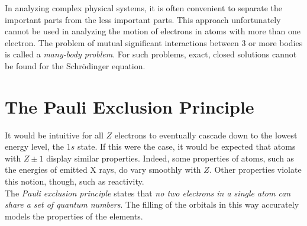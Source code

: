 \documentclass{subfiles}
\begin{document}
	In analyzing complex physical systems, it is often convenient to separate the important parts from the less important parts. This approach unfortunately cannot be used in analyzing the motion of electrons in atoms with more than one electron. The problem of mutual significant interactions between 3 or more bodies is called a \textit{many-body problem}. For such problems, exact, closed solutions cannot be found for the Schr\"odinger equation.
		\section{The Pauli Exclusion Principle}
			It would be intuitive for all \(Z\) electrons to eventually cascade down to the lowest energy level, the \(1s\) state. If this were the case, it would be expected that atoms with \(Z \pm 1\) display similar properties. Indeed, some properties of atoms, such as the energies of emitted X rays, do vary smoothly with \(Z\). Other properties violate this notion, though, such as reactivity. \\
			The \textit{Pauli exclusion principle} states that \textit{no two electrons in a single atom can share a set of quantum numbers}. The filling of the orbitals in this way accurately models the properties of the elements.
\end{document}
